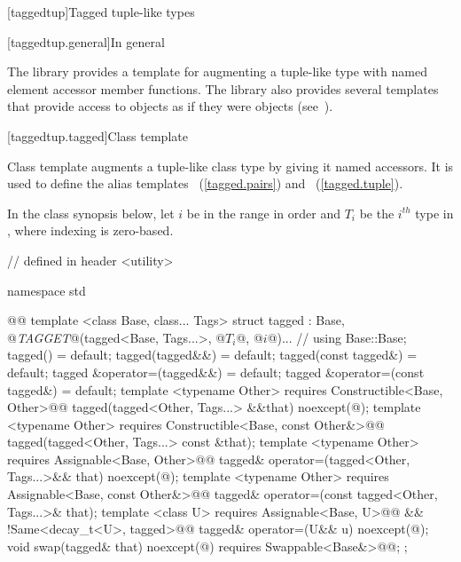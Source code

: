 {\color{addclr}
[taggedtup]{Tagged tuple-like types}

[taggedtup.general]{In general}

\pnum The library provides a template for augmenting a tuple-like type with named element accessor
member functions. The library also provides several templates that provide access to 
objects as if they were  objects (see~).


[taggedtup.tagged]{Class template }

Class template  augments a tuple-like class type by giving it named accessors. It is
used to define the alias templates ~(\ref{tagged.pairs}) and
~(\ref{tagged.tuple}).

\pnum In the class synopsis below, let $i$ be in the range
 in order and $T_i$ be the $i^{th}$ type in , where indexing
is zero-based.

%
\begin{codeblock}
// defined in header <utility>

namespace std { @@
  template <class Base, class... Tags>
  struct tagged :
    Base, @\textit{TAGGET}@(tagged<Base, Tags...>, @$T_i$@, @$i$@)... { // \seebelow
    using Base::Base;
    tagged() = default;
    tagged(tagged&&) = default;
    tagged(const tagged&) = default;
    tagged &operator=(tagged&&) = default;
    tagged &operator=(const tagged&) = default;
    template <typename Other>
      requires Constructible<Base, Other>@\newtxt{()}@
    tagged(tagged<Other, Tags...> &&that) noexcept(@\seebelow@);
    template <typename Other>
      requires Constructible<Base, const Other&>@\newtxt{()}@
    tagged(tagged<Other, Tags...> const &that);
    template <typename Other>
      requires Assignable<Base, Other>@\newtxt{()}@
    tagged& operator=(tagged<Other, Tags...>&& that) noexcept(@\seebelow@);
    template <typename Other>
      requires Assignable<Base, const Other&>@\newtxt{()}@
    tagged& operator=(const tagged<Other, Tags...>& that);
    template <class U>
      requires Assignable<Base, U>@\newtxt{()}@ && !Same<decay_t<U>, tagged>@\newtxt{()}@
    tagged& operator=(U&& u) noexcept(@\seebelow@);
    void swap(tagged& that) noexcept(@\seebelow@)
      requires Swappable<Base&>@\newtxt{()}@;
  };

}
\end{codeblock}}
